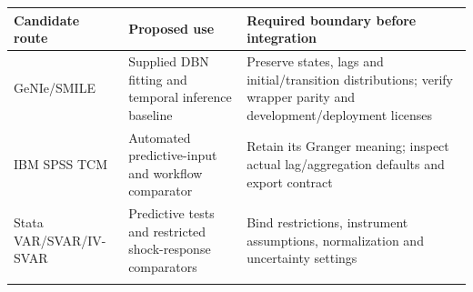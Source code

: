 \begin{longtable}[]{@{}lll@{}}
\toprule
\begin{minipage}[b]{0.30\columnwidth}\raggedright
Candidate route\strut
\end{minipage} & \begin{minipage}[b]{0.30\columnwidth}\raggedright
Proposed use\strut
\end{minipage} & \begin{minipage}[b]{0.30\columnwidth}\raggedright
Required boundary before integration\strut
\end{minipage}\tabularnewline
\midrule
\endhead
\begin{minipage}[t]{0.30\columnwidth}\raggedright
GeNIe/SMILE\strut
\end{minipage} & \begin{minipage}[t]{0.30\columnwidth}\raggedright
Supplied DBN fitting and temporal inference baseline\strut
\end{minipage} & \begin{minipage}[t]{0.30\columnwidth}\raggedright
Preserve states, lags and initial/transition distributions; verify
wrapper parity and development/deployment licenses\strut
\end{minipage}\tabularnewline
\begin{minipage}[t]{0.30\columnwidth}\raggedright
IBM SPSS TCM\strut
\end{minipage} & \begin{minipage}[t]{0.30\columnwidth}\raggedright
Automated predictive-input and workflow comparator\strut
\end{minipage} & \begin{minipage}[t]{0.30\columnwidth}\raggedright
Retain its Granger meaning; inspect actual lag/aggregation defaults and
export contract\strut
\end{minipage}\tabularnewline
\begin{minipage}[t]{0.30\columnwidth}\raggedright
Stata VAR/SVAR/IV-SVAR\strut
\end{minipage} & \begin{minipage}[t]{0.30\columnwidth}\raggedright
Predictive tests and restricted shock-response comparators\strut
\end{minipage} & \begin{minipage}[t]{0.30\columnwidth}\raggedright
Bind restrictions, instrument assumptions, normalization and uncertainty
settings\strut
\end{minipage}\tabularnewline
\begin{minipage}[t]{0.30\columnwidth}\raggedright

\end{minipage}
\end{longtable}
